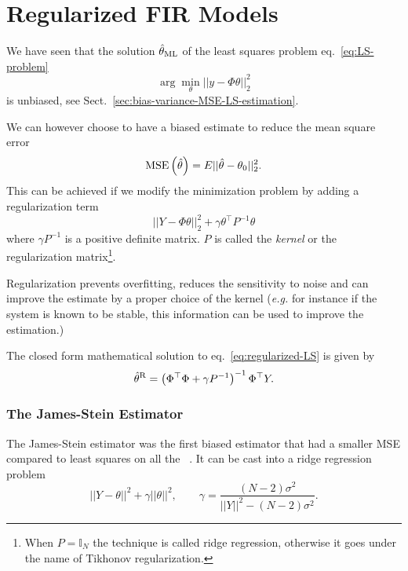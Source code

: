 \chapter{Regularized FIR Models}
\label{chap:regularised-FIR-models}

We have seen that the solution $\hat{\theta}_\textrm{ML}$ of the least squares problem eq.~\eqref{eq:LS-problem}
\begin{equation*}
  \arg\min_\theta ||y-\Phi \theta||_2^2
\end{equation*}
is unbiased, see Sect.~\ref{sec:bias-variance-MSE-LS-estimation}.

We can however choose to have a biased estimate to reduce the mean square error
\begin{equation*}
  \textrm{MSE}\left(\hat{\theta}\right) = E{||\hat{\theta}-\theta_0||_2^2}.
\end{equation*}
This can be achieved if we modify the minimization problem by adding a regularization term
\begin{equation}
  \label{eq:regularized-LS}
  ||Y-\Phi \theta||_2^2 + \gamma \theta^\top P^{-1}\theta
\end{equation}
where $\gamma P^{-1}$ is a positive definite matrix. $P$ is called the \emph{kernel} or the regularization matrix\footnote{When $P=\mathbb{I}_N$ the technique is called ridge regression, otherwise it goes under the name of Tikhonov regularization.}.

Regularization prevents overfitting, reduces the sensitivity to noise and can improve the estimate by a proper choice of the kernel (\textit{e.g.} for instance if the system is known to be stable, this information can be used to improve the estimation.)


The closed form mathematical solution to eq.~\eqref{eq:regularized-LS} is given by
\begin{equation}
  \label{eq:regularized-LS-solution}
  \hat{\theta}^\textrm{R} = \left(\Phi^\top\Phi + \gamma P^{-1}\right)^{-1}\Phi^\top Y.
\end{equation}

\subsection{The James-Stein Estimator}
\label{sec:james-stein-estimator}

The James-Stein estimator was the first biased estimator that had a smaller MSE compared to least squares on all the ~\cite[page~3]{pillonetto}. It can be cast into a ridge regression problem
\begin{equation*}
  ||Y-\theta||^2 + \gamma ||\theta||^2,\hspace{2em} \gamma = \frac{(N-2)\sigma^2}{||Y||^2 - (N-2)\sigma^2}.
\end{equation*}

